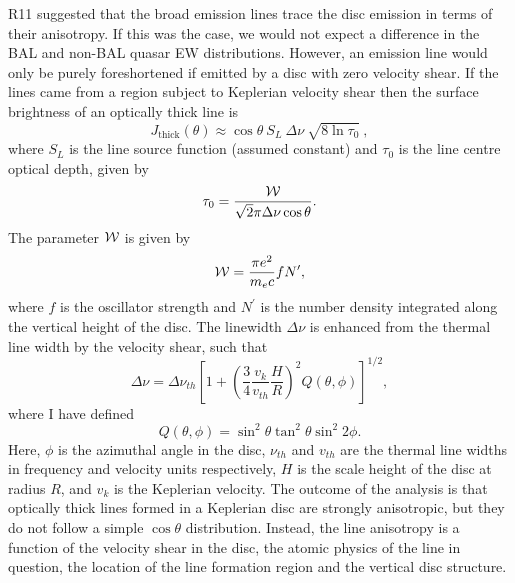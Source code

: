 R11 suggested that the broad emission lines trace the disc
emission in terms of their anisotropy. 
If this was the case, we would not expect a difference in the BAL and non-BAL
quasar EW distributions. However, an emission line would only be purely 
foreshortened if emitted by a disc with zero velocity shear. 
If the lines came from a region subject to
Keplerian velocity shear then the surface brightness of an optically thick 
line is \citep{hornemarsh1986}
\begin{equation}
J_{\mathrm{thick}}(\theta) \approx \cos \theta~S_L~\Delta \nu~\sqrt{8 \ln \tau_0} \ ,
\end{equation}
where $S_L$ is the line source function (assumed constant) and
$\tau_0$ is the line centre optical depth, given by
\begin{equation}
\tau_0 = \frac{{\cal W}}{\sqrt{2}\pi \Delta \nu \cos \theta}.
\end{equation}
The parameter ${{\cal W}}$ is given by
\begin{equation}
{{\cal W}} = \frac{\pi e^2}{m_e c}f N^\prime,
\end{equation}
where $f$ is the oscillator strength and $N^\prime$ is the number
density integrated along the vertical height of the disc. The linewidth
$\Delta \nu$ is enhanced from the thermal line width by the velocity shear, such
that
\begin{equation}
\Delta \nu = \Delta \nu_{th} \left[1 + 
\left(\frac{3}{4}\frac{v_{k}}{v_{th}}\frac{H}{R}\right)^2
Q(\theta, \phi)
\right]^{1/2},
\end{equation}
where I have defined
\begin{equation}
Q(\theta, \phi) =
\sin^2 \theta \tan^2 \theta \sin^2 2 \phi.
\end{equation}
Here, $\phi$ is the azimuthal angle in the disc, $\nu_{th}$ and $v_{th}$ are the 
thermal line widths in frequency and velocity units respectively, 
$H$ is the scale height of the disc at radius $R$, and $v_k$ is the
Keplerian velocity. The outcome of the \cite{hornemarsh1986} analysis is that optically thick lines 
formed in a Keplerian disc are strongly anisotropic, but they do not follow a simple 
$\cos \theta$ distribution. Instead, the line anisotropy is
a function of the velocity shear in the disc, the atomic physics of
the line in question, the location of the line formation region 
and the vertical disc structure. 

